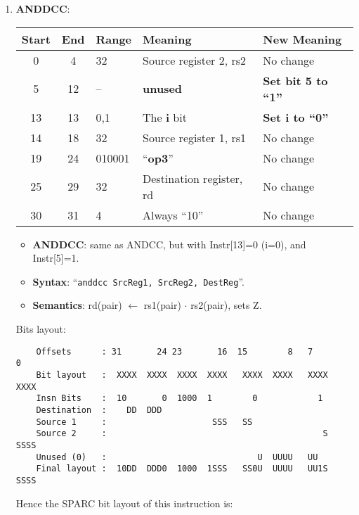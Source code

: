 \begin{enumerate}
\item \textbf{ANDDCC}:\\
  \begin{center}
    \begin{tabular}[p]{|c|c|l|l|l|}
      \hline
      \textbf{Start} & \textbf{End} & \textbf{Range} & \textbf{Meaning} &
                                                                          \textbf{New Meaning}\\
      \hline
      0 & 4 & 32 & Source register 2, rs2 & No change \\
      5 & 12 & -- & \textbf{unused} & \textbf{Set bit 5 to ``1''} \\
      13 & 13 & 0,1 & The \textbf{i} bit & \textbf{Set i to ``0''} \\
      14 & 18 & 32 & Source register 1, rs1 & No change \\
      19 & 24 & 010001 & ``\textbf{op3}'' & No change \\
      25 & 29 & 32 & Destination register, rd & No change \\
      30 & 31 & 4 & Always ``10'' & No change \\
      \hline
    \end{tabular}
  \end{center}
  \begin{itemize}
  \item []\textbf{ANDDCC}: same as ANDCC, but with Instr[13]=0 (i=0), and
    Instr[5]=1.
  \item []\textbf{Syntax}: ``\texttt{anddcc  SrcReg1, SrcReg2, DestReg}''.
  \item []\textbf{Semantics}: rd(pair) $\leftarrow$ rs1(pair) $\cdot$
    rs2(pair), sets Z.
  \end{itemize}
  Bits layout:
\begin{verbatim}
    Offsets      : 31       24 23       16  15        8   7        0
    Bit layout   :  XXXX  XXXX  XXXX  XXXX   XXXX  XXXX   XXXX  XXXX
    Insn Bits    :  10       0  1000  1        0            1       
    Destination  :    DD  DDD                                       
    Source 1     :                     SSS   SS
    Source 2     :                                           S  SSSS
    Unused (0)   :                              U  UUUU   UU        
    Final layout :  10DD  DDD0  1000  1SSS   SS0U  UUUU   UU1S  SSSS
\end{verbatim}

  Hence the SPARC bit layout of this instruction is:


\end{enumerate}

